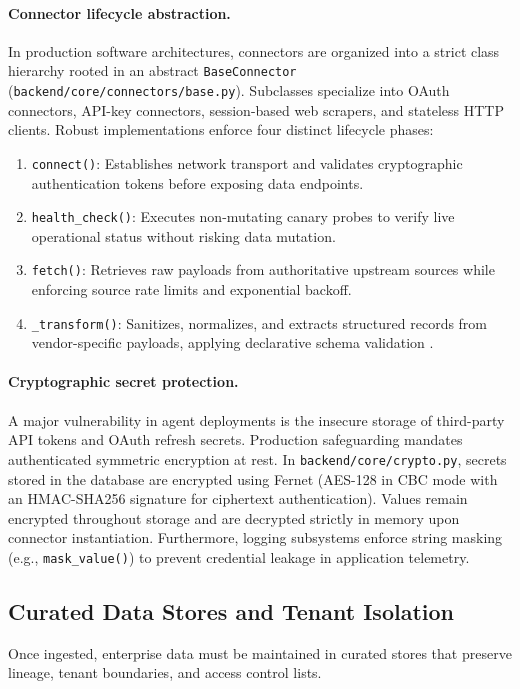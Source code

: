 \documentclass[10pt,a4paper,twocolumn]{article}
\begin{document}
\paragraph{Connector lifecycle abstraction.} In production software architectures, connectors are organized into a strict class hierarchy rooted in an abstract \texttt{BaseConnector} (\texttt{backend/core/connectors/base.py}). Subclasses specialize into OAuth connectors, API-key connectors, session-based web scrapers, and stateless HTTP clients. Robust implementations enforce four distinct lifecycle phases:
\begin{enumerate}[leftmargin=*]
  \item \texttt{connect()}: Establishes network transport and validates cryptographic authentication tokens before exposing data endpoints.
  \item \texttt{health\_check()}: Executes non-mutating canary probes to verify live operational status without risking data mutation.
  \item \texttt{fetch()}: Retrieves raw payloads from authoritative upstream sources while enforcing source rate limits and exponential backoff.
  \item \texttt{\_transform()}: Sanitizes, normalizes, and extracts structured records from vendor-specific payloads, applying declarative schema validation \cite{breck2019data,schelter2018deequ}.
\end{enumerate}

\paragraph{Cryptographic secret protection.} A major vulnerability in agent deployments is the insecure storage of third-party API tokens and OAuth refresh secrets. Production safeguarding mandates authenticated symmetric encryption at rest. In \texttt{backend/core/crypto.py}, secrets stored in the database are encrypted using Fernet (AES-128 in CBC mode with an HMAC-SHA256 signature for ciphertext authentication). Values remain encrypted throughout storage and are decrypted strictly in memory upon connector instantiation. Furthermore, logging subsystems enforce string masking (e.g., \texttt{mask\_value()}) to prevent credential leakage in application telemetry.

\subsection{Curated Data Stores and Tenant Isolation}
Once ingested, enterprise data must be maintained in curated stores that preserve lineage, tenant boundaries, and access control lists.
\end{document}
